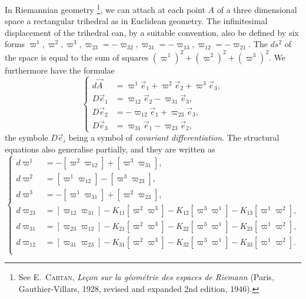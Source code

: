 \documentclass[leqno,11pt]{book}
\numberwithin{equation}{chapter}
\theoremstyle{shape1}
\theoremstyle{shape0}
\theoremstyle{shape2}
\theoremstyle{definition}
\begin{document}
In Riemannian geometry \footnote{See \textsc{E.~Cartan}, \emph{Le\c{c}on sur la g\'eom\'etrie des espaces de Riemann} (Paris, Gauthier-Villars, 1928, revised and expanded 2nd edition, 1946).}, we can attach at each point $A$ of a three dimensional space a rectangular trihedral as in Euclidean geometry. The infinitesimal displacement of the trihedral can, by a suitable convention, also be defined by six forms $\varpi^{1},\varpi^{2},\varpi^{3},\varpi_{23}=-\varpi_{32},\varpi_{31}=-\varpi_{13},\varpi_{12}=-\varpi_{21}$. The $ds^{2}$ of the space is equal to the sum of squares $(\varpi^{1})^{2}+(\varpi^{2})^{2}+(\varpi^{3})^{2}$. We furthermore have the formulae
\begin{equation}
  \label{eq:8.IV.1}\tag{IV, 1}
  \left\{
    \begin{aligned}
      d\vec A&=\varpi^{1}\vec e_{1}+\varpi^{2}\vec e_{2}+\varpi^{3}\vec e_{3},\\
      D\vec e_{1}&=\varpi_{12}\vec e_{2}-\varpi_{31}\vec e_{3},\\
      D\vec e_{2}&=-\varpi_{12}\vec e_{1}+\varpi_{23}\vec e_{3},\\
      D\vec e_{3}&=\varpi_{31}\vec e_{1}-\varpi_{23}\vec e_{2},
    \end{aligned}
  \right.
\end{equation}
the symbole $D\vec e_{i}$ being a symbol of \emph{covariant differentiation}. The structural equations also generalise partially, and they are written as
\begin{equation}
  \label{eq:8.IV.2}\tag{IV, 2}\left\{
  \begin{aligned}
    d\varpi^{1}&=-[\varpi^{2}\varpi_{12}]+[\varpi^{3}\varpi_{31}],\\
    d\varpi^{2}&=[\varpi^{1}\varpi_{12}]-[\varpi^{3}\varpi_{23}],\\
    d\varpi^{3}&=-[\varpi^{1}\varpi_{31}]+[\varpi^{2}\varpi_{23}],\\
    d\varpi_{23}&=[\varpi_{12}\varpi_{31}]-K_{11}[\varpi^{2}\varpi^{3}]-K_{12}[\varpi^{3}\varpi^{1}]-K_{13}[\varpi^{1}\varpi^{2}],\\
    d\varpi_{31}&=[\varpi_{23}\varpi_{12}]-K_{21}[\varpi^{2}\varpi^{3}]-K_{22}[\varpi^{3}\varpi^{1}]-K_{23}[\varpi^{1}\varpi^{2}],\\
    d\varpi_{12}&=[\varpi_{31}\varpi_{23}]-K_{31}[\varpi^{2}\varpi^{3}]-K_{32}[\varpi^{3}\varpi^{1}]-K_{33}[\varpi^{1}\varpi^{2}].\\
  \end{aligned}\right.
\end{equation}
\end{document}
